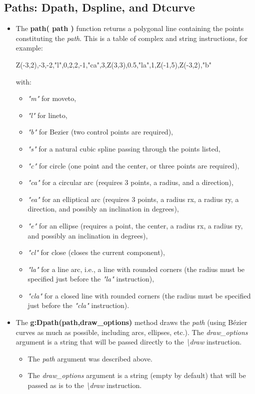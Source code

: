 \subsection{Paths: Dpath, Dspline, and Dtcurve}

\begin{itemize}
    \item The \textbf{path( path )} function returns a polygonal line containing the points constituting the \emph{path}. This is a table of complex and string instructions, for example:

\begin{TeXcode}
{ Z(-3,2),-3,-2,"l",0,2,2,-1,"ca",3,Z(3,3),0.5,"la",1,Z(-1,5),Z(-3,2),"b" }
\end{TeXcode}
with:
\begin{itemize}
    \item \emph{"m"} for moveto,
    \item \emph{"l"} for lineto,
    \item \emph{"b"} for Bezier (two control points are required),
    \item \emph{"s"} for a natural cubic spline passing through the points listed,
    \item \emph{"c"} for circle (one point and the center, or three points are required),
    \item \emph{"ca"} for a circular arc (requires 3 points, a radius, and a direction),
    \item \emph{"ea"} for an elliptical arc (requires 3 points, a radius rx, a radius ry, a direction, and possibly an inclination in degrees),
    \item \emph{"e"} for an ellipse (requires a point, the center, a radius rx, a radius ry, and possibly an inclination in degrees),
    \item \emph{"cl"} for close (closes the current component),
    \item \emph{"la"} for a line arc, i.e., a line with rounded corners (the radius must be specified just before the \emph{"la"} instruction),
    \item \emph{"cla"} for a closed line with rounded corners (the radius must be specified just before the \emph{"cla"} instruction). \end{itemize}

    \item The \textbf{g:Dpath(path,draw\_options)} method draws the \emph{path} (using Bézier curves as much as possible, including arcs, ellipses, etc.). The \emph{draw\_options} argument is a string that will be passed directly to the \emph{\textbackslash draw} instruction.
\begin{itemize}
    \item The \emph{path} argument was described above.
    \item The \emph{draw\_options} argument is a string (empty by default) that will be passed as is to the \emph{\textbackslash draw} instruction.
\end{itemize}


\end{itemize}
